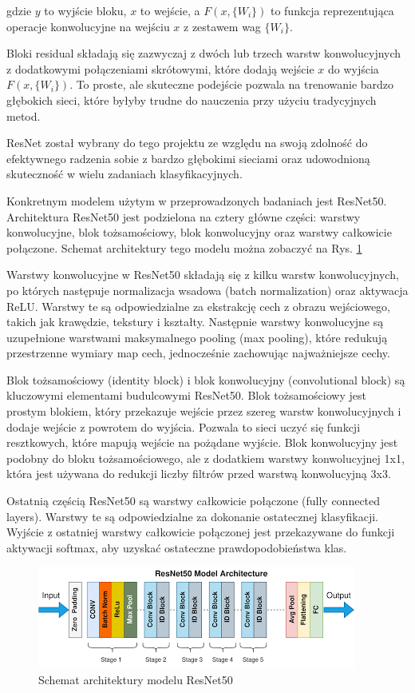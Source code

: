 gdzie \( y \) to wyjście bloku, \( x \) to wejście, a \( F(x, \{W_i\}) \) to funkcja reprezentująca operacje 
konwolucyjne na wejściu \( x \) z zestawem wag \( \{W_i\} \).

Bloki residual składają się zazwyczaj z dwóch lub trzech warstw konwolucyjnych z dodatkowymi połączeniami skrótowymi, 
które dodają wejście \( x \) do wyjścia \( F(x, \{W_i\}) \). To proste, ale skuteczne podejście pozwala na trenowanie 
bardzo głębokich sieci, które byłyby trudne do nauczenia przy użyciu tradycyjnych metod.

ResNet został wybrany do tego projektu ze względu na swoją zdolność do efektywnego radzenia sobie z bardzo głębokimi 
sieciami oraz udowodnioną skuteczność w wielu zadaniach klasyfikacyjnych. 

Konkretnym modelem użytym w przeprowadzonych badaniach
jest ResNet50. Architektura ResNet50 jest podzielona na cztery główne części: warstwy konwolucyjne, blok tożsamościowy, 
blok konwolucyjny oraz warstwy całkowicie połączone. Schemat architektury tego modelu można zobaczyć na Rys. \ref*{rys:resnet}

Warstwy konwolucyjne w ResNet50 składają się z kilku warstw konwolucyjnych, po których następuje normalizacja wsadowa 
(batch normalization) oraz aktywacja ReLU. Warstwy te są odpowiedzialne za ekstrakcję cech z obrazu wejściowego, takich jak 
krawędzie, tekstury i kształty. Następnie warstwy konwolucyjne są uzupełnione warstwami maksymalnego pooling (max pooling), 
które redukują przestrzenne wymiary map cech, jednocześnie zachowując najważniejsze cechy.

Blok tożsamościowy (identity block) i blok konwolucyjny (convolutional block) są kluczowymi elementami budulcowymi ResNet50. 
Blok tożsamościowy jest prostym blokiem, który przekazuje wejście przez szereg warstw konwolucyjnych i dodaje wejście z 
powrotem do wyjścia. Pozwala to sieci uczyć się funkcji resztkowych, które mapują wejście na pożądane wyjście. Blok konwolucyjny 
jest podobny do bloku tożsamościowego, ale z dodatkiem warstwy konwolucyjnej 1x1, która jest używana do redukcji liczby filtrów 
przed warstwą konwolucyjną 3x3.

Ostatnią częścią ResNet50 są warstwy całkowicie połączone (fully connected layers). Warstwy te są odpowiedzialne za dokonanie 
ostatecznej klasyfikacji. Wyjście z ostatniej warstwy całkowicie połączonej jest przekazywane do funkcji aktywacji softmax, aby 
uzyskać ostateczne prawdopodobieństwa klas.

\begin{figure}
	\centering\includegraphics[width=.9\textwidth]{img/resnet.png}
	\caption{Schemat architektury modelu ResNet50}  \label{rys:resnet}
\end{figure}

